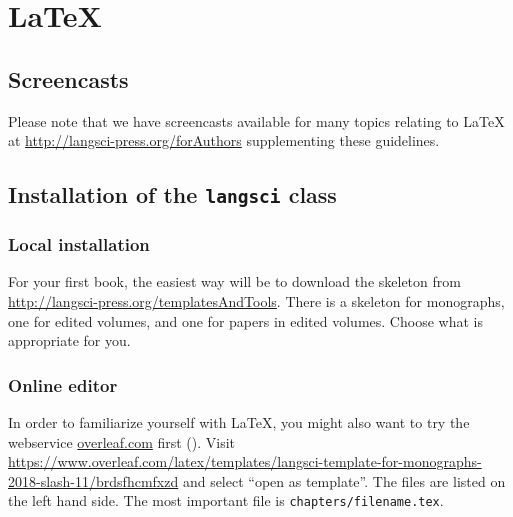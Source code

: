 \chapter{\LaTeX\xspace}

\section{Screencasts}
Please note that we have screencasts available for many topics relating to {\LaTeX\xspace} at \url{http://langsci-press.org/forAuthors} supplementing these guidelines.

\section{Installation of the \texttt{langsci} class}
\subsection{Local installation}
For your first book, the easiest way will be to download the skeleton from \url{http://langsci-press.org/templatesAndTools}.
There is a skeleton for monographs, one for edited volumes, and one for papers in edited volumes. Choose what is appropriate for you.



\subsection{Online editor}
In order to familiarize yourself with \LaTeX\xspace, you might also want to try the webservice \url{overleaf.com} first (). Visit \url{https://www.overleaf.com/latex/templates/langsci-template-for-monographs-2018-slash-11/brdsfhcmfxzd} and select ``open as template''. The files are listed on the left hand side. The most important file is \verb+chapters/filename.tex+.


